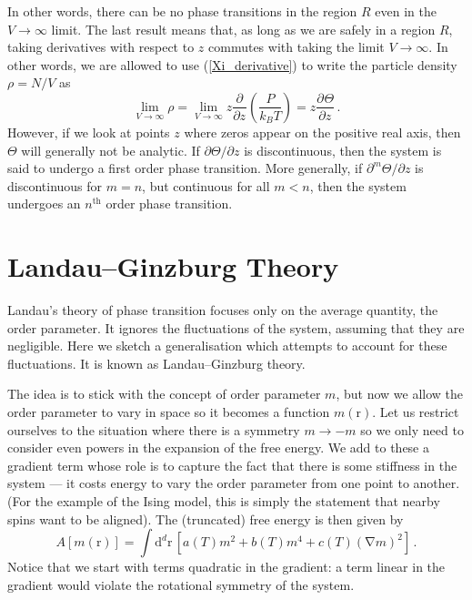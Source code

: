 \documentclass{article}
\theoremstyle{plain}\theoremheaderfont{\normalfont\bfseries}\theorembodyfont{\rmfamily}\theoremseparator{.}\newtheorem*{thm}{Theorem}\newtheorem*{law}{Law}\newtheorem*{pos}{Postulate}
\numberwithin{equation}{section}
\newcommand{\dd}[2][]{\mathrm{d}^{#1} #2\,}
\newcommand{\pdv}[3][]{\frac{\partial^{#1} #2}{{\partial #3}^{#1}}}
\newcommand{\vb}[1]{\bm{\mathrm{#1}}}
\newcommand{\grad}{\vb{\nabla}}
\begin{document}
    In other words, there can be no phase transitions in the region \(R\) even in the \(V\to\infty\) limit. The last result means that, as long as we are safely in a region \(R\), taking derivatives with respect to \(z\) commutes with taking the limit \(V\to\infty\). In other words, we are allowed to use (\ref{Xi_derivative}) to write the particle density \(\rho=N/V\) as
    \begin{equation}
        \lim_{V\to\infty}\rho=\lim_{V\to\infty}z\pdv{}{z}\left(\frac{P}{k_B T}\right)=z\pdv{\Theta}{z}\,.
    \end{equation}
    However, if we look at points \(z\) where zeros appear on the positive real axis, then \(\Theta\) will generally not be analytic. If \(\partial\Theta/\partial z\) is discontinuous, then the system is said to undergo a first order phase transition. More generally, if \(\partial^m\Theta/\partial z\) is discontinuous for \(m=n\), but continuous for all \(m<n\), then the system undergoes an \(n^{\text{th}}\) order phase transition.

    \section{Landau--Ginzburg Theory}\label{Chap:Landau_Ginzburg}
    Landau's theory of phase transition focuses only on the average quantity, the order parameter. It ignores the fluctuations of the system, assuming that they are negligible. Here we sketch a generalisation which attempts to account for these fluctuations. It is known as Landau--Ginzburg theory.

    The idea is to stick with the concept of order parameter \(m\), but now we allow the order parameter to vary in space so it becomes a function \(m(\vb{r})\). Let us restrict ourselves to the situation where there is a symmetry \(m\to -m\) so we only need to consider even powers in the expansion of the free energy. We add to these a gradient term whose role is to capture the fact that there is some stiffness in the system --- it costs energy to vary the order parameter from one point to another. (For the example of the Ising model, this is simply the statement that nearby spins want to be aligned). The (truncated) free energy is then given by
    \begin{equation}\label{Landau_Ginzburg_free_energy}
        A[m(\vb{r})]=\int\dd[d]{\vb{r}}[a(T)m^2+b(T)m^4+c(T)(\grad m)^2]\,.
    \end{equation}
    Notice that we start with terms quadratic in the gradient: a term linear in the gradient would violate the rotational symmetry of the system.
\end{document}
